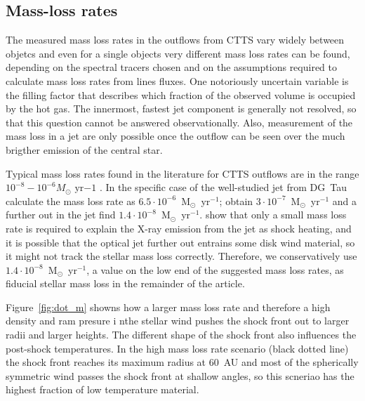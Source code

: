 \subsection{Mass-loss rates}
The measured mass loss rates in the outflows from CTTS vary widely between objetcs and even for a single objects very different mass loss rates can be found, depending on the spectral tracers chosen and on the assumptions required to calculate mass loss rates from lines fluxes. One notoriously uncertain variable is the filling factor that describes which fraction of the observed volume is occupied by the hot gas. The innermost, fastest jet component is generally not resolved, so that this question cannot be answered observationally. Also, measurement of the mass loss in a jet are only possible once the outflow can be seen over the much brigther emission of the central star. 

Typical mass loss rates found in the literature for CTTS outflows are in the range $10^{-8}-10^{-6}M_{\odot}\textrm{ yr}{-1}$ \citep{1999A&A...342..717B,2006A&A...456..189P}. In the specific case of the well-studied jet from DG~Tau \citet{1997A&A...327..671L} calculate the  mass loss rate as $6.5\cdot 10^{-6}$~M$_{\odot}$~yr$^{-1}$; \citet{1995ApJ...452..736H}
obtain $3\cdot 10^{-7}$~M$_{\odot}$~yr$^{-1}$ and a further out in the jet \citet{2000A&A...356L..41L} find $1.4\cdot 10^{-8}$~M$_{\odot}$~yr$^{-1}$. 
\citet{2009A&A...493..579G} show that only a small mass loss rate is required to explain the X-ray emission from the jet as shock heating, and it is possible that the optical jet further out entrains some disk wind material, so it might not track the stellar mass loss correctly.
Therefore, we conservatively use $1.4\cdot 10^{-8}$~M$_{\odot}$~yr$^{-1}$, a value on the low end of the suggested mass loss rates, as fiducial stellar mass loss in the remainder of the article.

Figure~\ref{fig:dot_m} showns how a larger mass loss rate and therefore a high density and ram presure i nthe stellar wind pushes the shock front out to larger radii and larger heights. The different shape of the shock front also influences the post-shock temperatures. In the high mass loss rate scenario (black dotted line) the shock front reaches its maximum radius at 60~AU and most of the spherically symmetric wind passes the shock front at shallow angles, so this scneriao has the highest fraction of low temperature material.
